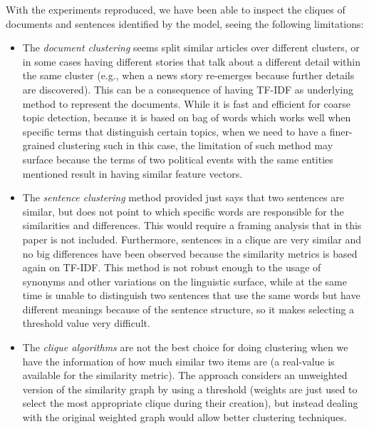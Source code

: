 With the experiments reproduced, we have been able to inspect the cliques of documents and sentences identified by the model, seeing the following limitations:

\begin{itemize}
    \item The \emph{document clustering} seems split similar articles over different clusters, or in some cases having different stories that talk about a different detail within the same cluster (e.g., when a news story re-emerges because further details are discovered). This can be a consequence of having TF-IDF as underlying method to represent the documents. While it is fast and efficient for coarse topic detection, because it is based on bag of words which works well when specific terms that distinguish certain topics, when we need to have a finer-grained clustering such in this case, the limitation of such method may surface because the terms of two political events with the same entities mentioned result in having similar feature vectors.
    \item The \emph{sentence clustering} method provided just says that two sentences are similar, but does not point to which specific words are responsible for the similarities and differences. This would require a framing analysis that in this paper is not included. Furthermore, sentences in a clique are very similar and no big differences have been observed because the similarity metrics is based again on TF-IDF. This method is not robust enough to the usage of synonyms and other variations on the linguistic surface, while at the same time is unable to distinguish two sentences that use the same words but have different meanings because of the sentence structure, so it makes selecting a threshold value very difficult.
    \item The \emph{clique algorithms} are not the best choice for doing clustering when we have the information of how much similar two items are (a real-value is available for the similarity metric). The approach considers an unweighted version of the similarity graph by using a threshold (weights are just used to select the most appropriate clique during their creation), but instead dealing with the original weighted graph would allow better clustering techniques. %
\end{itemize}


